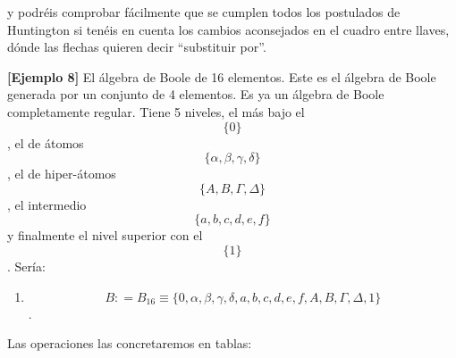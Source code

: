 \begin{enumerate}
  y podréis comprobar fácilmente que se cumplen todos los postulados de
  Huntington si te\-néis en cuenta los cambios aconsejados en el cuadro
  entre llaves, dónde las flechas quieren decir ``substituir por''.

  \textbf{{[}Ejemplo 8{]}} El álgebra de Boole de 16 elementos. Este es
  el álgebra de Boole generada por un conjunto de 4 elementos. Es ya un
  álgebra de Boole completamente regular. Tiene 5 niveles, el más bajo
  el \[\{ 0\}\], el de átomos \[\{{\alpha,\beta,\gamma,\delta}\}\], el
  de hiper-átomos \[\{{Α,Β,\Gamma,\Delta}\}\] , el intermedio
  \[\{{a,b,c,d,e,f}\}\]y finalmente el nivel superior con el \[\{ 1\}\].
  Sería:

  \begin{enumerate}
  \def\labelenumii{\arabic{enumii}.}
  \setcounter{enumii}{1}
  \tightlist
  \item
    \[B{{: = B_{16}} \equiv {\{{0,\alpha,\beta,\gamma,\delta,a,b,c,d,e,f,Α,Β,\Gamma,\Delta,1}\}}}\].
  \end{enumerate}

  Las operaciones las concretaremos en tablas:


\end{enumerate}

